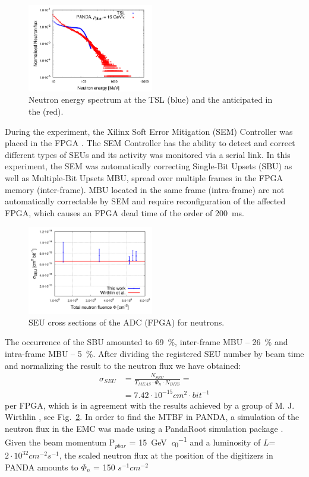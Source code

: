 \documentclass[12pt,a4paper, twocolumn]{article}
\newcommand{\Reffig}[1]{Fig.~\ref{#1}}
\begin{document}
\begin{figure}[htb]
\includegraphics[width=0.49\textwidth, trim={0 2 3 0}, clip]{fig/Figure4.png}
\caption{\label{fig:sadc:irradiation}Neutron energy spectrum at the TSL (blue) and the anticipated in the \panda (red).}
\end{figure}
During the experiment, the Xilinx Soft Error Mitigation (SEM) Controller was placed in the FPGA \cite{xilinx}. The SEM Controller has the ability to detect and correct different types of SEUs and its activity was monitored via a serial link.
In this experiment, the SEM was automatically correcting Single-Bit Upsets (SBU) as well as Multiple-Bit Upsets MBU, spread over multiple frames in the FPGA memory (inter-frame). MBU located in the same frame (intra-frame) are not automatically correctable by SEM and require reconfiguration of the affected FPGA, which causes an FPGA dead time of the order of \SI{200}{\milli\second}.
\begin{figure}[htb]
\includegraphics[width=0.49\textwidth, trim={0 0 0 0}, clip]{fig/ADCcssneutron.pdf}
\caption{\label{fig:sadc:cssneutron} SEU cross sections of the ADC (FPGA) for neutrons.}
\end{figure}
The occurrence of the SBU amounted to 69~\%, inter-frame MBU -- 26~\% and intra-frame MBU -- 5~\%.
After dividing the registered SEU number by beam time and normalizing the result to the neutron flux we have obtained:
\begin{equation} \label{eq1}
\begin{split}
\sigma_{SEU}&=\frac{N_{SEU}}{T_{MEAS}\cdot \Phi_n\cdot N_{BITS}}=\\
&=7.42\cdot 10^{-15} cm^2\cdot bit ^{-1}
\end{split}
\end{equation}
per FPGA, which is in agreement with the results achieved by a group of M. J. Wirthlin \cite{Wirthlin_2014}, see \Reffig{fig:sadc:cssneutron}. 
In order to find the MTBF in PANDA, a simulation of the neutron flux in the EMC was made using a PandaRoot simulation package \cite{Messchendorp:2010zz}. Given the beam momentum P$_{pbar}$ = \SI{15}{\giga\electronvolt\per\clight}
 and a luminosity of $L$= $2\cdot10^{32}cm^{-2}s^{-1}$, the scaled neutron flux at the position of the digitizers in PANDA amounts to 
$\Phi_n$ = 150 $s^{-1}cm^{-2}$
\end{document}
